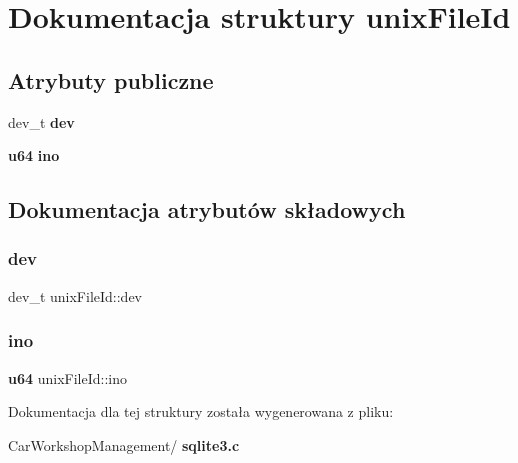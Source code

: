 \section{Dokumentacja struktury unix\+File\+Id}
\label{structunix_file_id}
\subsection*{Atrybuty publiczne}
\begin{DoxyCompactItemize}
\item 
dev\+\_\+t \textbf{ dev}
\item 
\textbf{ u64} \textbf{ ino}
\end{DoxyCompactItemize}


\subsection{Dokumentacja atrybutów składowych}
\mbox{\label{structunix_file_id_acf703d95b9a1ae2f34affb7e9ae45e1b}} 
\subsubsection{dev}
{\footnotesize\ttfamily dev\+\_\+t unix\+File\+Id\+::dev}

\mbox{\label{structunix_file_id_af64b38d971f7495524ed628116c5301d}} 
\subsubsection{ino}
{\footnotesize\ttfamily \textbf{ u64} unix\+File\+Id\+::ino}



Dokumentacja dla tej struktury została wygenerowana z pliku\+:\begin{DoxyCompactItemize}
\item 
Car\+Workshop\+Management/\textbf{ sqlite3.\+c}\end{DoxyCompactItemize}
